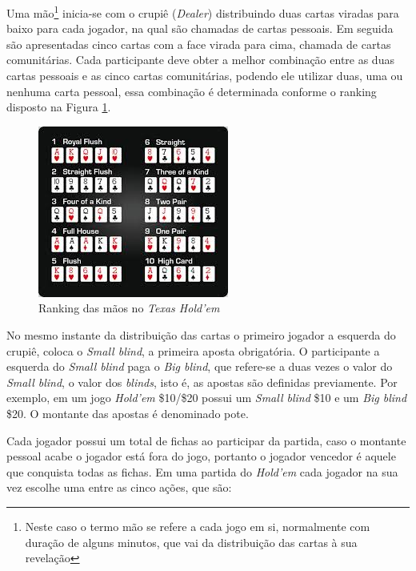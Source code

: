 \documentclass[
	12pt,				%
	oneside,			%
	a4paper,			%
	chapter=TITLE,		%
	section=TITLE,		%
	subsection=Title,	%
	subsubsection=Title,%
	brazil,				%
	]{abntex2}
\begin{document}
Uma mão\footnote{Neste caso o termo mão se refere a cada jogo em si, normalmente com duração de alguns minutos, que vai da distribuição das cartas à sua revelação} inicia-se com o crupiê (\textit{Dealer}) distribuindo duas cartas viradas para baixo para cada jogador, na qual são chamadas de cartas pessoais. Em seguida são apresentadas cinco cartas com a face virada para cima, chamada de cartas comunitárias. Cada participante deve obter a melhor combinação entre as duas cartas pessoais e as cinco cartas comunitárias, podendo ele utilizar duas, uma ou nenhuma carta pessoal, essa combinação é determinada conforme o ranking disposto na Figura \ref{rakingmaos}.

\begin{figure}[h]
	\centering
	\includegraphics[scale=.84]{ranking}
	\caption{Ranking das mãos no \textit{Texas Hold'em}}
	\label{rakingmaos}
\end{figure}


No mesmo instante da distribuição das cartas o primeiro jogador a esquerda do crupiê, coloca o \textit{Small blind}, a primeira aposta obrigatória. O participante a esquerda do \textit{Small blind} paga o \textit{Big blind}, que refere-se a duas vezes o valor do \textit{Small blind}, o valor dos \textit{blinds}, isto é, as apostas são definidas previamente. Por exemplo, em um jogo \textit{Hold'em} \$10/\$20 possui um \textit{Small blind} \$10 e um \textit{Big blind} \$20. O montante das apostas é denominado pote.

Cada jogador possui um total de fichas ao participar da partida, caso o montante pessoal acabe o jogador está fora do jogo, portanto o jogador vencedor é aquele que conquista todas as fichas. Em uma partida do \textit{Hold'em} cada jogador na sua vez escolhe uma entre as cinco ações, que são:
\end{document}
